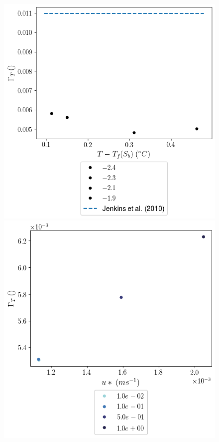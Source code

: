 \documentclass[draft]{styles/agujournal2019}
\begin{document}
\begin{figure}
\begin{minipage}{0.5\textwidth}
    \end{minipage}
    \begin{minipage}{0.5\textwidth}
        \includegraphics[trim={0 4.1cm 0 0},clip,width=\textwidth]{Figures/gammaT_dT_tav12_zlim2.png}
    \end{minipage}%
    \begin{minipage}{0.5\textwidth}
        \includegraphics[trim={0 0cm 0 0},clip,width=\textwidth]{Figures/gamma_T__us__dslope_tav12_tlim52.png}

\end{minipage}
\end{figure}
\end{document}
